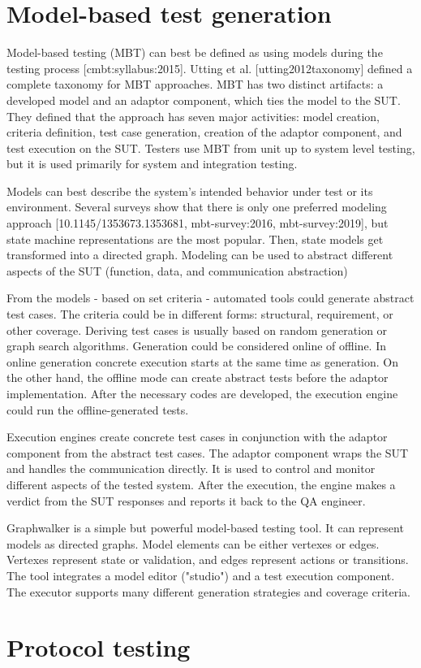 \section{Model-based test generation}

Model-based testing (MBT) can best be defined as using models during the testing process [cmbt:syllabus:2015]. Utting et al. [utting2012taxonomy] defined a complete taxonomy for MBT approaches. MBT has two distinct artifacts: a developed model and an adaptor component, which ties the model to the SUT. They defined that the approach has seven major activities: model creation, criteria definition, test case generation, creation of the adaptor component, and test execution on the SUT. Testers use MBT from unit up to system level testing, but it is used primarily for system and integration testing.

Models can best describe the system's intended behavior under test or its environment. Several surveys show that there is only one preferred modeling approach [10.1145/1353673.1353681, mbt-survey:2016, mbt-survey:2019], but state machine representations are the most popular. Then, state models get transformed into a directed graph. Modeling can be used to abstract different aspects of the SUT (function, data, and communication abstraction)

From the models - based on set criteria - automated tools could generate abstract test cases. The criteria could be in different forms: structural, requirement, or other coverage. Deriving test cases is usually based on random generation or graph search algorithms. Generation could be considered online of offline. In online generation concrete execution starts at the same time as generation. On the other hand, the offline mode can create abstract tests before the adaptor implementation. After the necessary codes are developed, the execution engine could run the offline-generated tests.

Execution engines create concrete test cases in conjunction with the adaptor component from the abstract test cases. The adaptor component wraps the SUT and handles the communication directly. It is used to control and monitor different aspects of the tested system. After the execution, the engine makes a verdict from the SUT responses and reports it back to the QA engineer.

Graphwalker is a simple but powerful model-based testing tool. It can represent models as directed graphs. Model elements can be either vertexes or edges. Vertexes represent state or validation, and edges represent actions or transitions. The tool integrates a model editor ("studio") and a test execution component. The executor supports many different generation strategies and coverage criteria.

\section{Protocol testing}

